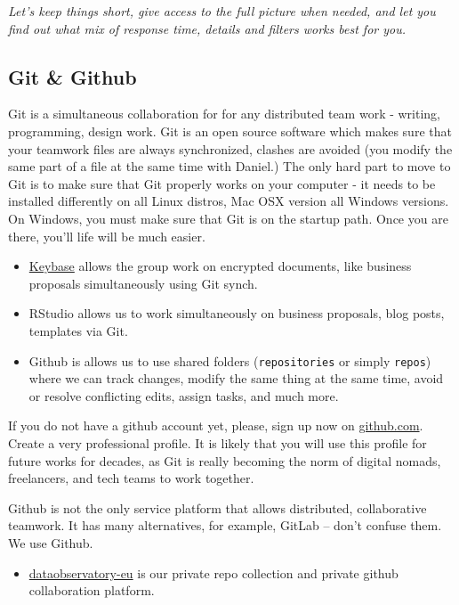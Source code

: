 \documentclass[
  fontsize=13pt,
  english,
  a4paper,
  openany, a4paper, oneside]{book}
\providecommand{\tightlist}{%
  \setlength{\itemsep}{0pt}\setlength{\parskip}{0pt}}
\begin{document}
\emph{Let's keep things short, give access to the full picture when needed, and let you find out what mix of response time, details and filters works best for you.}

\hypertarget{github}{%
\subsection{Git \& Github}\label{github}}

Git is a simultaneous collaboration for for any distributed team work - writing, programming, design work. Git is an open source software which makes sure that your teamwork files are always synchronized, clashes are avoided (you modify the same part of a file at the same time with Daniel.) The only hard part to move to Git is to make sure that Git properly works on your computer - it needs to be installed differently on all Linux distros, Mac OSX version all Windows versions. On Windows, you must make sure that Git is on the startup path. Once you are there, you'll life will be much easier.

\begin{itemize}
\item
  \protect\hyperlink{keybase}{Keybase} allows the group work on encrypted documents, like business proposals simultaneously using Git synch.
\item
  RStudio allows us to work simultaneously on business proposals, blog posts, templates via Git.
\item
  Github is allows us to use shared folders (\texttt{repositories} or simply \texttt{repos}) where we can track changes, modify the same thing at the same time, avoid or resolve conflicting edits, assign tasks, and much more.
\end{itemize}

If you do not have a github account yet, please, sign up now on \href{https://github.com/}{github.com}. Create a very professional profile. It is likely that you will use this profile for future works for decades, as Git is really becoming the norm of digital nomads, freelancers, and tech teams to work together.

Github is not the only service platform that allows distributed, collaborative teamwork. It has many alternatives, for example, GitLab -- don't confuse them. We use Github.

\begin{itemize}
\tightlist
\item
  \href{https://github.com/dataobservatory-eu}{dataobservatory-eu} is our private repo collection and private github collaboration platform.
\end{itemize}
\end{document}
